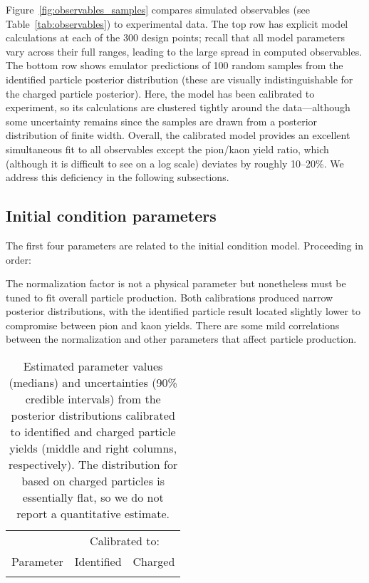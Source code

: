 \documentclass[aps,prc,reprint,amsmath,nofootinbib]{revtex4-1}
\newcommand{\paddedhline}{\noalign{\smallskip}\hline\noalign{\smallskip}}
\begin{document}
Figure~\ref{fig:observables_samples} compares simulated observables (see Table~\ref{tab:observables}) to experimental data.
The top row has explicit model calculations at each of the 300 design points;
recall that all model parameters vary across their full ranges, leading to the large spread in computed observables.
The bottom row shows emulator predictions of 100 random samples from the identified particle posterior distribution (these are visually indistinguishable for the charged particle posterior).
Here, the model has been calibrated to experiment, so its calculations are clustered tightly around the data---although some uncertainty remains since the samples are drawn from a posterior distribution of finite width.
Overall, the calibrated model provides an excellent simultaneous fit to all observables except the pion/kaon yield ratio, which (although it is difficult to see on a log scale) deviates by roughly 10--20\%.
We address this deficiency in the following subsections.


\subsection{Initial condition parameters}

The first four parameters are related to the initial condition model.
Proceeding in order:

The normalization factor is not a physical parameter but nonetheless must be tuned to fit overall particle production.
Both calibrations produced narrow posterior distributions, with the identified particle result located slightly lower to compromise between pion and kaon yields.
There are some mild correlations between the normalization and other parameters that affect particle production.

\begin{table}
  \caption{
    \label{tab:posterior}
    Estimated parameter values (medians) and uncertainties (90\% credible intervals) from the posterior distributions calibrated to identified and charged particle yields (middle and right columns, respectively).
    The distribution for \Tsw based on charged particles is essentially flat, so we do not report a quantitative estimate.
  }
  \begin{ruledtabular}
    \begin{tabular}{lll}
      & \multicolumn{2}{c}{Calibrated to:} \\
      \noalign{\smallskip}\cline{2-3}\noalign{\smallskip}
      Parameter & \multicolumn{1}{c}{Identified} & \multicolumn{1}{c}{Charged} \\
      \paddedhline
      
    \end{tabular}
  \end{ruledtabular}
\end{table}
\end{document}
